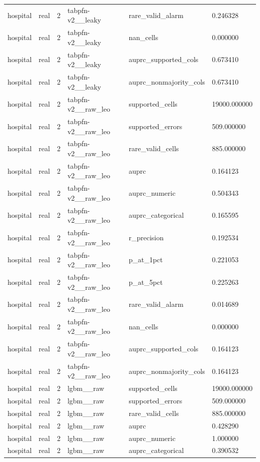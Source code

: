 \begin{tabular}{llllll}
hospital & real & 2 & tabpfn-v2\_\_leaky & rare\_valid\_alarm & 0.246328 \\
hospital & real & 2 & tabpfn-v2\_\_leaky & nan\_cells & 0.000000 \\
hospital & real & 2 & tabpfn-v2\_\_leaky & auprc\_supported\_cols & 0.673410 \\
hospital & real & 2 & tabpfn-v2\_\_leaky & auprc\_nonmajority\_cols & 0.673410 \\
hospital & real & 2 & tabpfn-v2\_\_raw\_leo & supported\_cells & 19000.000000 \\
hospital & real & 2 & tabpfn-v2\_\_raw\_leo & supported\_errors & 509.000000 \\
hospital & real & 2 & tabpfn-v2\_\_raw\_leo & rare\_valid\_cells & 885.000000 \\
hospital & real & 2 & tabpfn-v2\_\_raw\_leo & auprc & 0.164123 \\
hospital & real & 2 & tabpfn-v2\_\_raw\_leo & auprc\_numeric & 0.504343 \\
hospital & real & 2 & tabpfn-v2\_\_raw\_leo & auprc\_categorical & 0.165595 \\
hospital & real & 2 & tabpfn-v2\_\_raw\_leo & r\_precision & 0.192534 \\
hospital & real & 2 & tabpfn-v2\_\_raw\_leo & p\_at\_1pct & 0.221053 \\
hospital & real & 2 & tabpfn-v2\_\_raw\_leo & p\_at\_5pct & 0.225263 \\
hospital & real & 2 & tabpfn-v2\_\_raw\_leo & rare\_valid\_alarm & 0.014689 \\
hospital & real & 2 & tabpfn-v2\_\_raw\_leo & nan\_cells & 0.000000 \\
hospital & real & 2 & tabpfn-v2\_\_raw\_leo & auprc\_supported\_cols & 0.164123 \\
hospital & real & 2 & tabpfn-v2\_\_raw\_leo & auprc\_nonmajority\_cols & 0.164123 \\
hospital & real & 2 & lgbm\_\_raw & supported\_cells & 19000.000000 \\
hospital & real & 2 & lgbm\_\_raw & supported\_errors & 509.000000 \\
hospital & real & 2 & lgbm\_\_raw & rare\_valid\_cells & 885.000000 \\
hospital & real & 2 & lgbm\_\_raw & auprc & 0.428290 \\
hospital & real & 2 & lgbm\_\_raw & auprc\_numeric & 1.000000 \\
hospital & real & 2 & lgbm\_\_raw & auprc\_categorical & 0.390532 \\

\end{tabular}
